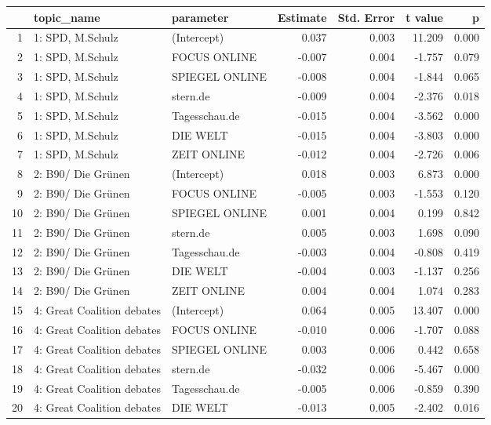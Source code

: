 \begin{table}[ht]
\centering
\begin{tabular}{rllrrrr}
  \hline
 & topic\_name & parameter & Estimate & Std. Error & t value & p \\ 
  \hline
1 & 1: SPD, M.Schulz & (Intercept) & 0.037 & 0.003 & 11.209 & 0.000 \\ 
  2 & 1: SPD, M.Schulz & FOCUS ONLINE & -0.007 & 0.004 & -1.757 & 0.079 \\ 
  3 & 1: SPD, M.Schulz & SPIEGEL ONLINE & -0.008 & 0.004 & -1.844 & 0.065 \\ 
  4 & 1: SPD, M.Schulz & stern.de & -0.009 & 0.004 & -2.376 & 0.018 \\ 
  5 & 1: SPD, M.Schulz & Tagesschau.de & -0.015 & 0.004 & -3.562 & 0.000 \\ 
  6 & 1: SPD, M.Schulz & DIE WELT & -0.015 & 0.004 & -3.803 & 0.000 \\ 
  7 & 1: SPD, M.Schulz & ZEIT ONLINE & -0.012 & 0.004 & -2.726 & 0.006 \\ 
  8 & 2: B90/ Die Grünen & (Intercept) & 0.018 & 0.003 & 6.873 & 0.000 \\ 
  9 & 2: B90/ Die Grünen & FOCUS ONLINE & -0.005 & 0.003 & -1.553 & 0.120 \\ 
  10 & 2: B90/ Die Grünen & SPIEGEL ONLINE & 0.001 & 0.004 & 0.199 & 0.842 \\ 
  11 & 2: B90/ Die Grünen & stern.de & 0.005 & 0.003 & 1.698 & 0.090 \\ 
  12 & 2: B90/ Die Grünen & Tagesschau.de & -0.003 & 0.004 & -0.808 & 0.419 \\ 
  13 & 2: B90/ Die Grünen & DIE WELT & -0.004 & 0.003 & -1.137 & 0.256 \\ 
  14 & 2: B90/ Die Grünen & ZEIT ONLINE & 0.004 & 0.004 & 1.074 & 0.283 \\ 
  15 & 4: Great Coalition debates & (Intercept) & 0.064 & 0.005 & 13.407 & 0.000 \\ 
  16 & 4: Great Coalition debates & FOCUS ONLINE & -0.010 & 0.006 & -1.707 & 0.088 \\ 
  17 & 4: Great Coalition debates & SPIEGEL ONLINE & 0.003 & 0.006 & 0.442 & 0.658 \\ 
  18 & 4: Great Coalition debates & stern.de & -0.032 & 0.006 & -5.467 & 0.000 \\ 
  19 & 4: Great Coalition debates & Tagesschau.de & -0.005 & 0.006 & -0.859 & 0.390 \\ 
  20 & 4: Great Coalition debates & DIE WELT & -0.013 & 0.005 & -2.402 & 0.016 \\ 

\end{tabular}
\end{table}
